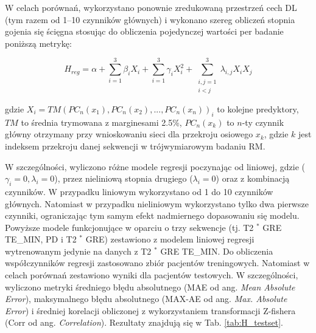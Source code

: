W celach porównań, wykorzystano ponownie zredukowaną przestrzeń cech DL (tym razem od 1--10 czynników głównych) i wykonano szereg obliczeń stopnia gojenia się ścięgna stosując do obliczenia pojedynczej wartości per badanie poniższą metrykę: 

\begin{equation}
H_{reg} = \alpha + \sum_{i=1}^{3}\beta_{i}X_{i} + \sum_{i=1}^{3}\gamma_{i}X_{i}^{2} +
\sum_{\substack{i, j = 1\\ i < j}}^{3}\lambda_{i,j}X_{i}X_{j}
\end{equation}

gdzie $X_i = TM(PC_n(x_1), PC_n(x_2),..., PC_n(x_n))_{i}$ to kolejne predyktory, $TM$ to średnia trymowana z marginesami 2.5\%, $PC_n(x_k)$ to $n$-ty czynnik główny otrzymany przy wnioskowaniu sieci dla przekroju osiowego $x_k$, gdzie $k$ jest indeksem przekroju danej sekwencji w trójwymiarowym badaniu RM.

W szczególności, wyliczono różne modele regresji poczynając od liniowej, gdzie ($\gamma_{i}=0, \lambda_{i}=0$), przez nieliniową stopnia drugiego ($\lambda_{i}=0$) oraz z kombinacją czynników. W przypadku liniowym wykorzystano od 1 do 10 czynników głównych. Natomiast w przypadku nieliniowym wykorzystano tylko dwa pierwsze czynniki, ograniczając tym samym efekt nadmiernego dopasowaniu się modelu. Powyższe modele funkcjonujące w oparciu o trzy sekwencje (tj. T2 $^\ast$ GRE TE\_MIN, PD i T2 $^\ast$ GRE) zestawiono z modelem liniowej regresji wytrenowanym jedynie na danych z T2 $^\ast$ GRE TE\_MIN. Do obliczenia współczynników regresji zastosowano zbiór pacjentów treningowych. Natomiast w celach porównań zestawiono wyniki dla pacjentów testowych. W szczególności, wyliczono metryki średniego błędu absolutnego (MAE od ang. \textit{Mean Absolute Error}), maksymalnego błędu absolutnego (MAX-AE od ang. \textit{Max. Absolute Error}) i średniej korelacji obliczonej z wykorzystaniem transformacji Z-fishera (Corr od ang. \textit{Correlation}). Rezultaty znajdują się w Tab. \ref{tab:H_testset}.


